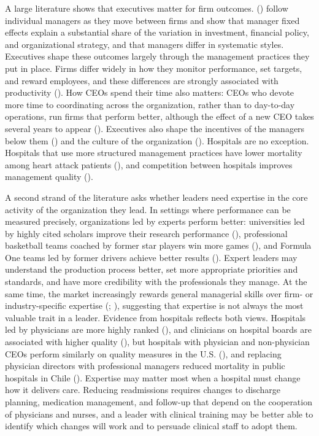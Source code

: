 \documentclass[12pt]{article}
\theoremstyle{definition}   %
\begin{document}
    A large literature shows that executives matter for firm outcomes. \citeauthor{bertrand2003managing} (\citeyear{bertrand2003managing}) follow individual managers as they move between firms and show that manager fixed effects explain a substantial share of the variation in investment, financial policy, and organizational strategy, and that managers differ in systematic styles. Executives shape these outcomes largely through the management practices they put in place. Firms differ widely in how they monitor performance, set targets, and reward employees, and these differences are strongly associated with productivity (\cite{bloom2007measuring}). How CEOs spend their time also matters: CEOs who devote more time to coordinating across the organization, rather than to day-to-day operations, run firms that perform better, although the effect of a new CEO takes several years to appear (\cite{bandiera2020ceo}). Executives also shape the incentives of the managers below them (\cite{choudhury2020managers}) and the culture of the organization (\cite{graham2022corporate}). Hospitals are no exception. Hospitals that use more structured management practices have lower mortality among heart attack patients (\cite{mcconnell2013management}), and competition between hospitals improves management quality (\cite{bloom2015impact}).

    A second strand of the literature asks whether leaders need expertise in the core activity of the organization they lead. In settings where performance can be measured precisely, organizations led by experts perform better: universities led by highly cited scholars improve their research performance (\cite{goodall2009highly}), professional basketball teams coached by former star players win more games (\cite{goodall2011why}), and Formula One teams led by former drivers achieve better results (\cite{goodall2015expert}). Expert leaders may understand the production process better, set more appropriate priorities and standards, and have more credibility with the professionals they manage. At the same time, the market increasingly rewards general managerial skills over firm- or industry-specific expertise (\cite{custodio2013generalists}; \cite{frydman2019rising}), suggesting that expertise is not always the most valuable trait in a leader. Evidence from hospitals reflects both views. Hospitals led by physicians are more highly ranked (\cite{goodall2011physician}), and clinicians on hospital boards are associated with higher quality (\cite{veronesi2013clinicians}), but hospitals with physician and non-physician CEOs perform similarly on quality measures in the U.S. (\cite{see2022comparison}), and replacing physician directors with professional managers reduced mortality in public hospitals in Chile (\cite{munoz2025managers}). Expertise may matter most when a hospital must change how it delivers care. Reducing readmissions requires changes to discharge planning, medication management, and follow-up that depend on the cooperation of physicians and nurses, and a leader with clinical training may be better able to identify which changes will work and to persuade clinical staff to adopt them.
\end{document}
